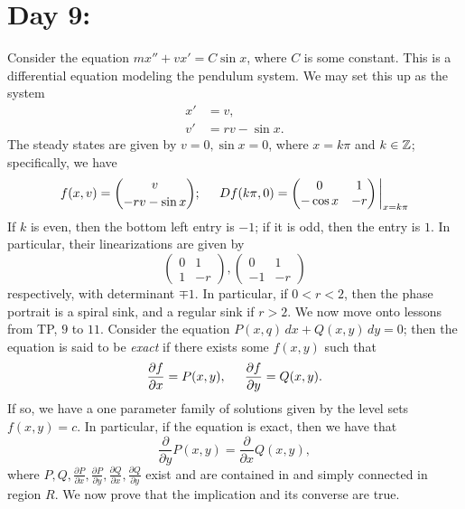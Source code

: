 \section{Day 9:}
Consider the equation $mx'' + vx' = C \sin x$, where $C$ is some constant. This is a differential equation modeling the pendulum system. We may set this up as the system
\begin{align*}
    x' &= v, \\
    v' &= rv - \sin x.
\end{align*}
The steady states are given by $v = 0, \sin x = 0$, where $x = k \pi$ and $k \in \mathbb Z$; specifically, we have
\[ f(x, v) = \binom{v}{-rv - \sin x} ; \hspace{0.2in} Df(k\pi, 0) = \restr{\begin{pmatrix} 0 & 1 \\ - \cos x & -r \end{pmatrix}}{x=k\pi} \]
If $k$ is even, then the bottom left entry is $-1$; if it is odd, then the entry is $1$. In particular, their linearizations are given by
\[ \begin{pmatrix} 0 & 1 \\ 1 & -r \end{pmatrix}, \begin{pmatrix} 0 & 1 \\ -1 & -r \end{pmatrix} \]
respectively, with determinant $\mp 1$. In particular, if $0 < r < 2$, then the phase portrait is a spiral sink, and a regular sink if $r > 2$.
\medskip\newline
We now move onto lessons from TP, $9$ to $11$. Consider the equation $P(x, q) \, dx + Q(x, y) \, dy = 0$; then the equation is said to be \textit{exact} if there exists some $f(x, y)$ such that
\[ \frac{\partial f}{\partial x} = P(x, y), \hspace{0.2in} \frac{\partial f}{\partial y} = Q(x, y). \]
If so, we have a one parameter family of solutions given by the level sets $f(x, y) = c$. In particular, if the equation is exact, then we have that
\[ \frac{\partial}{\partial y} P(x, y) = \frac{\partial}{\partial x} Q(x, y), \]
where $P, Q, \frac{\partial P}{\partial x}, \frac{\partial P}{\partial y}, \frac{\partial Q}{\partial x}, \frac{\partial Q}{\partial y}$ exist and are contained in and simply connected in region $R$. We now prove that the implication and its converse are true.
